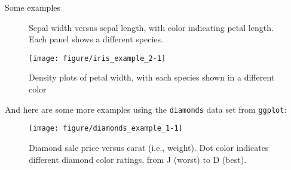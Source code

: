 \documentclass[capfont, final]{beamer}\usepackage[]{graphicx}\usepackage[]{color}
\newenvironment{knitrout}{}{} %
\newlength{\twocolwid}
\begin{document}
\begin{frame}[t, fragile]
\begin{columns}[T]
\begin{column}{\twocolwid}
\begin{block}{Some examples}
\begin{figure}
\begin{knitrout}
\end{knitrout}
\caption{Sepal width versus sepal length, with color indicating petal length. Each panel shows a different species.}
\label{fig:iris_example_1}
\end{figure}

\begin{figure}
\begin{knitrout}\small
{}\color{fgcolor}
\texttt{[image: figure/iris\_example\_2-1]} 

\end{knitrout}
\caption{Density plots of petal width, with each species shown in a different color}
\label{fig:iris_example_2}
\end{figure}

And here are some more examples using the \texttt{diamonds} data set from \texttt{ggplot}:

\begin{figure}
\begin{knitrout}\small
{}\color{fgcolor}
\texttt{[image: figure/diamonds\_example\_1-1]} 

\end{knitrout}
\caption{Diamond sale price versus carat (i.e., weight). Dot color indicates different diamond color ratings, from J (worst) to D (best).}
\label{fig:diamonds_example_1}
\end{figure}


\end{block}
\end{column}
\end{columns}
\end{frame}
\end{document}
